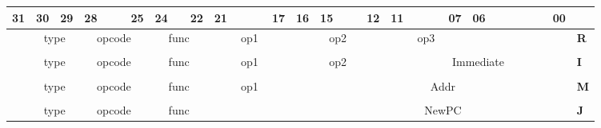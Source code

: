     \begin{table}[h]
        \begin{center}
            \setlength{\tabcolsep}{4pt}
            \small
            \begin{tabular}{c c c c c c c c c c c c c c c c c c c c c c c c c c c c c c c c l}
            31 & 30 & 29 & 28 &
               &    & 25 & 24 &
               & 22 & 21 &    &
               &    & 17 & 16 &
            15 &    &    & 12 &
            11 &    &    &    &
            07 & 06 &    &    &
               &    &    & 00 & \\
            \hline
            \multicolumn{1}{|c|}{} &
            \multicolumn{2}{c|}{\cellcolor{instgray}type} &
            \multicolumn{4}{c|}{\cellcolor{instgray}opcode} &
            \multicolumn{3}{c|}{\cellcolor{instgray}func} &
            \multicolumn{5}{c|}{\cellcolor{instgray}op1} &
            \multicolumn{5}{c|}{\cellcolor{instgray}op2} &
            \multicolumn{5}{c|}{\cellcolor{instgray}op3} &
            \multicolumn{7}{c|}{} &
            \textbf{R}\\
            \hline
            \\
            \hline
            \multicolumn{1}{|c|}{} &
            \multicolumn{2}{c|}{\cellcolor{instgray}type} &
            \multicolumn{4}{c|}{\cellcolor{instgray}opcode} &
            \multicolumn{3}{c|}{\cellcolor{instgray}func} &
            \multicolumn{5}{c|}{\cellcolor{instgray}op1} &
            \multicolumn{5}{c|}{\cellcolor{instgray}op2} &
            \multicolumn{12}{c|}{\cellcolor{instgray}Immediate} &
            \textbf{I}\\
            \hline
            \\
            \hline
            \multicolumn{1}{|c|}{} &
            \multicolumn{2}{c|}{\cellcolor{instgray}type} &
            \multicolumn{4}{c|}{\cellcolor{instgray}opcode} &
            \multicolumn{3}{c|}{\cellcolor{instgray}func} &
            \multicolumn{5}{c|}{\cellcolor{instgray}op1} &
            \multicolumn{1}{c|}{} &
            \multicolumn{16}{c|}{\cellcolor{instgray}Addr} &
            \textbf{M}\\
            \hline
            \\
            \hline
            \multicolumn{1}{|c|}{} &
            \multicolumn{2}{c|}{\cellcolor{instgray}type} &
            \multicolumn{4}{c|}{\cellcolor{instgray}opcode} &
            \multicolumn{3}{c|}{\cellcolor{instgray}func} &
            \multicolumn{6}{c|}{} &
            \multicolumn{16}{c|}{\cellcolor{instgray}NewPC} &
            \textbf{J}\\
            \hline
            \end{tabular}
        \end{center}
    \end{table}